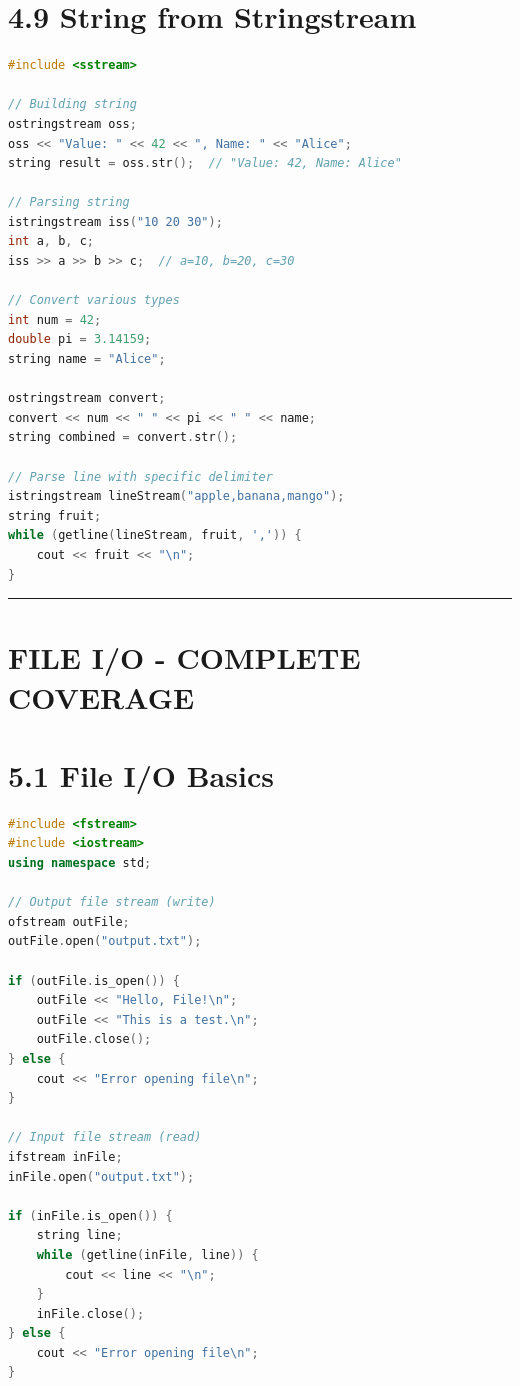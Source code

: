 \hypertarget{string-from-stringstream}{%
\section{4.9 String from Stringstream}\label{string-from-stringstream}}

\begin{lstlisting}[language={C++}]
#include <sstream>

// Building string
ostringstream oss;
oss << "Value: " << 42 << ", Name: " << "Alice";
string result = oss.str();  // "Value: 42, Name: Alice"

// Parsing string
istringstream iss("10 20 30");
int a, b, c;
iss >> a >> b >> c;  // a=10, b=20, c=30

// Convert various types
int num = 42;
double pi = 3.14159;
string name = "Alice";

ostringstream convert;
convert << num << " " << pi << " " << name;
string combined = convert.str();

// Parse line with specific delimiter
istringstream lineStream("apple,banana,mango");
string fruit;
while (getline(lineStream, fruit, ',')) {
    cout << fruit << "\n";
}
\end{lstlisting}

\begin{center}\rule{0.5\linewidth}{0.5pt}\end{center}

\hypertarget{file-io---complete-coverage}{%
\section{FILE I/O - COMPLETE
COVERAGE}\label{file-io---complete-coverage}}

\hypertarget{file-io-basics}{%
\section{5.1 File I/O Basics}\label{file-io-basics}}

\begin{lstlisting}[language={C++}]
#include <fstream>
#include <iostream>
using namespace std;

// Output file stream (write)
ofstream outFile;
outFile.open("output.txt");

if (outFile.is_open()) {
    outFile << "Hello, File!\n";
    outFile << "This is a test.\n";
    outFile.close();
} else {
    cout << "Error opening file\n";
}

// Input file stream (read)
ifstream inFile;
inFile.open("output.txt");

if (inFile.is_open()) {
    string line;
    while (getline(inFile, line)) {
        cout << line << "\n";
    }
    inFile.close();
} else {
    cout << "Error opening file\n";
}
\end{lstlisting}


